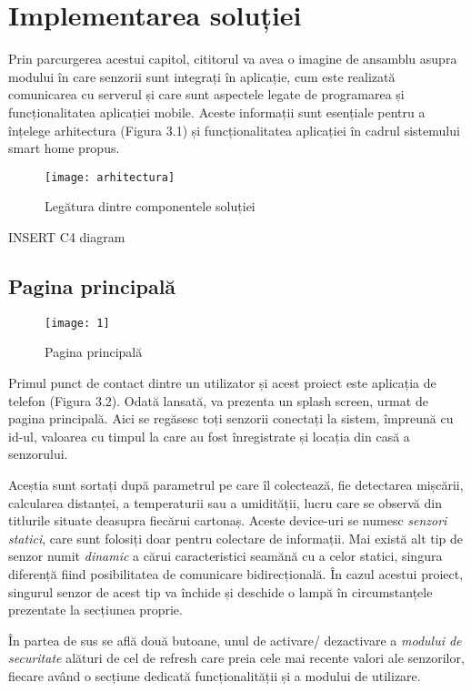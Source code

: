 \chapter{Implementarea soluției}

Prin parcurgerea acestui capitol, cititorul va avea o imagine de ansamblu asupra modului în care senzorii sunt integrați în aplicație, cum este realizată comunicarea cu serverul și care sunt aspectele legate de programarea și funcționalitatea aplicației mobile. Aceste informații sunt esențiale pentru a înțelege arhitectura (Figura 3.1) și funcționalitatea aplicației în cadrul sistemului smart home propus.

\begin{figure}[h]
	\centering
	\texttt{[image: arhitectura]}
	\caption{Legătura dintre componentele soluției}
	\label{fig:arhitectura}
\end{figure}

INSERT C4 diagram

\newpage
\section{Pagina principală}

\begin{wrapfigure}{r}{0.4\textwidth}
	\texttt{[image: 1]}
	\caption{Pagina principală}
	\label{fig:1}
\end{wrapfigure}

Primul punct de contact dintre un utilizator și acest proiect este aplicația de telefon (Figura 3.2). Odată lansată, va prezenta un splash screen, urmat de pagina principală. Aici se regăsesc toți senzorii conectați la sistem, împreună cu id-ul, valoarea cu timpul la care au fost înregistrate și locația din casă a senzorului. 

Aceștia sunt sortați după parametrul pe care îl colectează, fie detectarea mișcării, calcularea distanței, a temperaturii sau a umidității, lucru care se observă din titlurile situate deasupra fiecărui cartonaș. Aceste device-uri se numesc \emph{senzori statici}, care sunt folosiți doar pentru colectare de informații. Mai există alt tip de senzor numit \emph{dinamic} a cărui caracteristici seamănă cu a celor statici, singura diferență fiind posibilitatea de comunicare bidirecțională. În cazul acestui proiect, singurul senzor de acest tip va închide și deschide o lampă în circumstanțele prezentate la secțiunea proprie.

În partea de sus se află două butoane, unul de activare/ dezactivare a \emph{modului de securitate} alături de cel de refresh care preia cele mai recente valori ale senzorilor, fiecare având o secțiune dedicată funcționalității și a modului de utilizare.

